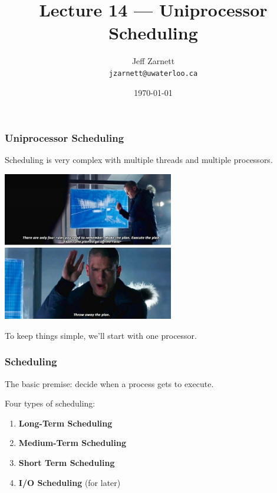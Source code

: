 

\title{Lecture 14 --- Uniprocessor Scheduling }

\author{Jeff Zarnett \\ \small \texttt{jzarnett@uwaterloo.ca}}
\date{\today}




\begin{frame}
  \titlepage

 \end{frame}



\begin{frame}
\frametitle{Uniprocessor Scheduling}

Scheduling is very complex with multiple threads and multiple processors.

\begin{center}
	\includegraphics[width=0.56\textwidth]{images/makeplan.jpg}
\end{center}

To keep things simple, we'll start with one processor.


\end{frame}


\begin{frame}
\frametitle{Scheduling}

The basic premise: decide when a process gets to execute. 

Four types of scheduling: 

\begin{enumerate}
	\item \textbf{Long-Term Scheduling}
	\item \textbf{Medium-Term Scheduling}
	\item \textbf{Short Term Scheduling}
	\item \textbf{I/O Scheduling} (for later)
\end{enumerate}

\end{frame}



